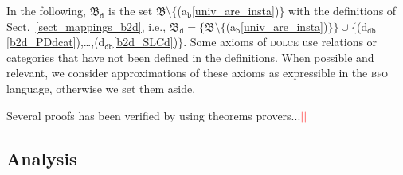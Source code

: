 \documentclass[ao]{iosart2x}
\newcommand{\nb}[1]{\textcolor{red}{$|$}\marginpar{\hspace*{-0cm}\parbox{20mm}{\scriptsize\raggedright\textcolor{red}{#1}}}}
\newcommand{\bfoAxLabel}{\textrm{a$_\texttt{b}$}}
\newcommand{\dbDefLabel}{\textrm{d$_\texttt{db}$}}
\newcommand{\refbfoax}[1]{({\bfoAxLabel}\ref{#1})}
\newcommand{\refdbdf}[1]{({\dbDefLabel}\ref{#1})}
\newcommand{\dolce}{{\textsc{dolce}}}
\newcommand{\bfo}{{\textsc{bfo}}}
\newcommand {\thbfo} {\ensuremath{\mathfrak{B}}}
\newcommand {\dbmap} {\ensuremath{\mathfrak{M}_\texttt{db}}}
\newcommand {\bdmap} {\ensuremath{\mathfrak{M}_\texttt{bd}}}
\newcommand {\thbfobdmap} {\ensuremath{\mathfrak{B}_\texttt{d}}}
\begin{document}
In the following, $\thbfobdmap$ is the set $\thbfo \setminus \{$\refbfoax{univ_are_insta}$\}$ with the definitions of Sect.~\ref{sect_mappings_b2d}, %
i.e., $\thbfobdmap = \{\thbfo \setminus \{$\refbfoax{univ_are_insta}$\}\} \cup \{$\refdbdf{b2d_PDdcat},\ldots,\refdbdf{b2d_SLCd}$\}$.%
%
%
%
Some axioms of {\dolce} use relations or categories that have not been defined in the definitions. When possible and relevant, we consider approximations of these axioms as expressible in the {\bfo} language, otherwise we set them aside.




{\color{red} Several proofs has been verified by using theorems provers...}\nb{CM: aggiungere qualche considerazione generale su numero assiomi dimostrati ecc.?}\nb{SB: forse si potrebbe dare il n. tot. e la percentuale provata (ma allora da aggiungere anche nella sez. 5)}

\subsection{Analysis}\label{sect_analysis_b2d}
\end{document}

